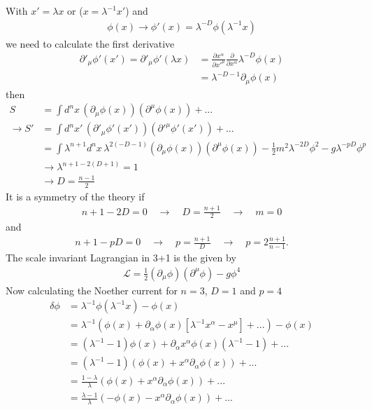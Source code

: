 \documentclass[../main.tex]{subfiles}
\begin{document}
With $x'=\lambda x$ or ($x=\lambda^{-1}x'$) and
\begin{align}
\phi(x)\rightarrow\phi'(x)=\lambda^{-D}\phi(\lambda^{-1}x)
\end{align}
we need to calculate the first derivative
\begin{align}
\partial'_\mu\phi'(x')
=\partial'_\mu\phi'(\lambda x)
&=\frac{\partial x^\alpha}{\partial x'^\mu}\frac{\partial}{\partial x^\alpha}\lambda^{-D}\phi(x)\\
&=\lambda^{-D-1}\partial_\mu\phi(x)
\end{align}
then
\begin{align}
S
&=\int d^nx\,(\partial_\mu\phi(x))(\partial^\mu\phi(x))+...\\
\rightarrow S'
&=\int d^nx'\,(\partial'_\mu\phi'(x'))(\partial'^\mu\phi'(x'))+...\\
&=\int \lambda^{n+1}d^nx\,\lambda^{2(-D-1)}(\partial_\mu\phi(x))(\partial^\mu\phi(x))-\frac{1}{2}m^2\lambda^{-2D}\phi^2-g\lambda^{-pD}\phi^p\\
&\rightarrow \lambda^{n+1-2(D+1)}=1\\
&\rightarrow D=\frac{n-1}{2}
\end{align}
It is a symmetry of the theory if
\begin{align}
n+1-2D=0\quad\rightarrow\quad D=\frac{n+1}{2} \quad\rightarrow\quad m=0
\end{align}
and
\begin{align}
n+1-pD=0\quad\rightarrow\quad p=\frac{n+1}{D}\quad\rightarrow\quad p=2\frac{n+1}{n-1}.
\end{align}
The scale invariant Lagrangian in 3+1 is the given by
\begin{align}
\mathcal{L}=\frac{1}{2}(\partial_\mu\phi)(\partial^\mu\phi)-g\phi^4
\end{align} 
Now calculating the Noether current for $n=3$, $D=1$ and $p=4$
\begin{align}
\delta\phi&=\lambda^{-1}\phi(\lambda^{-1}x)-\phi(x)\\
&=\lambda^{-1}\left(\phi(x)+\partial_\alpha\phi(x)[\lambda^{-1}x^\alpha-x^\mu]+...\right)-\phi(x)\\
&=(\lambda^{-1}-1)\phi(x)+\partial_\alpha x^\alpha\phi(x)(\lambda^{-1}-1)+...\\
&=(\lambda^{-1}-1)(\phi(x)+x^\alpha\partial_\alpha\phi(x))+...\\
&=\frac{1-\lambda}{\lambda}(\phi(x)+x^\alpha\partial_\alpha\phi(x))+...\\
&=\frac{\lambda-1}{\lambda}(-\phi(x)-x^\alpha\partial_\alpha\phi(x))+...
\end{align}
\end{document}
